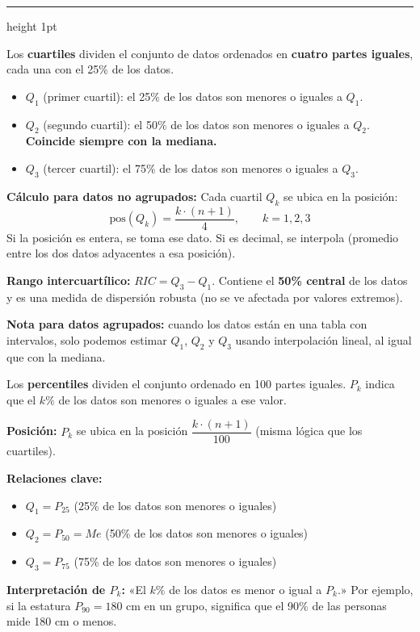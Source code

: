 \documentclass[11pt, letterpaper]{article}
\newcommand{\subbloque}[1]{%
  \vspace{14pt}
  \noindent{\large\bfseries\color{zenitnavy} #1}\par
  \vspace{4pt}\hrule height 1pt\vspace{8pt}}
\begin{document}
\subbloque{5.1 Cuartiles y percentiles}
\label{sub:5.1}

\begin{tcolorbox}[importantbox, title={Cuartiles $Q_1$, $Q_2$, $Q_3$}]
Los \textbf{cuartiles} dividen el conjunto de datos ordenados en \textbf{cuatro partes iguales}, cada una con el 25\% de los datos.

\begin{itemize}
  \item $Q_1$ (primer cuartil): el 25\% de los datos son menores o iguales a $Q_1$.
  \item $Q_2$ (segundo cuartil): el 50\% de los datos son menores o iguales a $Q_2$. \textbf{Coincide siempre con la mediana.}
  \item $Q_3$ (tercer cuartil): el 75\% de los datos son menores o iguales a $Q_3$.
\end{itemize}

\textbf{Cálculo para datos no agrupados:}
Cada cuartil $Q_k$ se ubica en la posición:
\[
\text{pos}(Q_k) = \frac{k \cdot (n+1)}{4}, \qquad k = 1, 2, 3
\]
Si la posición es entera, se toma ese dato. Si es decimal, se interpola (promedio entre los dos datos adyacentes a esa posición).

\medskip

\textbf{Rango intercuartílico:} $RIC = Q_3 - Q_1$. Contiene el \textbf{50\% central} de los datos y es una medida de dispersión robusta (no se ve afectada por valores extremos).

\medskip

\textbf{Nota para datos agrupados:} cuando los datos están en una tabla con intervalos, solo podemos estimar $Q_1$, $Q_2$ y $Q_3$ usando interpolación lineal, al igual que con la mediana.
\end{tcolorbox}

\begin{tcolorbox}[importantbox, title={Percentiles $P_k$}]
Los \textbf{percentiles} dividen el conjunto ordenado en 100 partes iguales. $P_k$ indica que el $k\%$ de los datos son menores o iguales a ese valor.

\textbf{Posición:} $P_k$ se ubica en la posición $\dfrac{k \cdot (n+1)}{100}$ (misma lógica que los cuartiles).

\textbf{Relaciones clave:}
\begin{itemize}
  \item $Q_1 = P_{25}$ \quad (25\% de los datos son menores o iguales)
  \item $Q_2 = P_{50} = Me$ \quad (50\% de los datos son menores o iguales)
  \item $Q_3 = P_{75}$ \quad (75\% de los datos son menores o iguales)
\end{itemize}

\textbf{Interpretación de $P_k$:} «El $k\%$ de los datos es menor o igual a $P_k$.» Por ejemplo, si la estatura $P_{90} = 180$ cm en un grupo, significa que el 90\% de las personas mide 180 cm o menos.
\end{tcolorbox}
\end{document}
